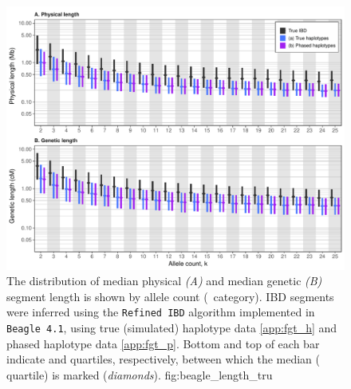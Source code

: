 

\begin{figure}[!htb]
\includegraphics[width=\textwidth]{./img/ch3/beagle_length_tru_new}
{The distribution of median physical \emph{(A)} and median genetic \emph{(B)} segment length is shown by allele count (\fk{}~category).
IBD segments were inferred using the \texttt{Refined\,IBD} algorithm implemented in \texttt{Beagle~4.1}, using true (simulated) haplotype data \ref{app:fgt_h} and phased haplotype data \ref{app:fgt_p}.
Bottom and top of each bar indicate  and  quartiles, respectively, between which the median ( quartile) is marked (\emph{diamonds}).}
{fig:beagle_length_tru}
\end{figure}
